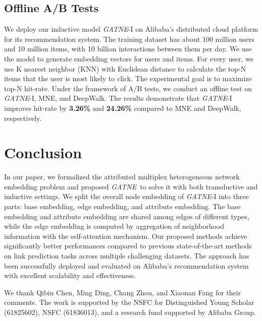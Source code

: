 \documentclass[sigconf]{acmart}
\newcommand{\company}{Alibaba}
\newcommand{\model}{{\em GATNE}}
\begin{document}
\subsection{Offline A/B Tests}
\label{sec:online}

We deploy our inductive model \model-I on \company's distributed cloud platform for its recommendation system. The training dataset has about 100 million users and 10 million items, with 10 billion interactions between them per day. We use the model to generate embedding vectors for users and items. For every user, we use K nearest neighbor (KNN) with Euclidean distance to calculate the top-N items that the user is most likely to click. The experimental goal is to maximize top-N hit-rate. Under the framework of A/B tests, we conduct an offline test on \model-I, MNE, and DeepWalk. The results demonstrate that \model-I improves hit-rate by \textbf{3.26\%} and \textbf{24.26\%} compared to MNE and DeepWalk, respectively.





 
\section{Conclusion} \label{sec:conclusion}


In our paper, we formalized the attributed multiplex heterogeneous network embedding problem and proposed \model\ to solve it with both transductive and inductive settings. We split the overall node embedding of \model-I into three parts: base embedding, edge embedding, and attribute embedding. The base embedding and attribute embedding are shared among edges of different types, while the edge embedding is computed by aggregation of neighborhood information with the self-attention mechanism. Our proposed methods achieve significantly better performances compared to previous state-of-the-art methods on link prediction tasks across multiple challenging datasets. The approach has been successfully deployed and evaluated on \company's recommendation system with excellent scalability and effectiveness.
 
\begin{acks}
We thank Qibin Chen, Ming Ding, Chang Zhou, and Xiaonan Fang for their comments. The work is supported by the
NSFC for Distinguished Young Scholar 
(61825602),
NSFC (61836013), 
and a research fund supported by Alibaba Group.
\end{acks}



\end{document}
